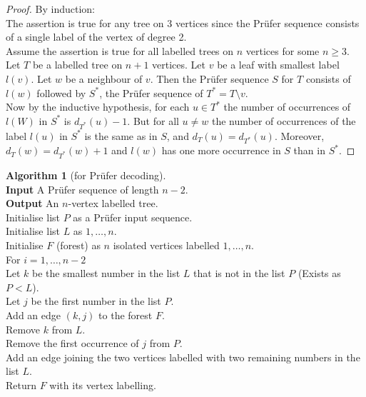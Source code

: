 \documentclass{article}
\theoremstyle{definition}
\newtheorem*{alg}{Algorithm}
\begin{document}
\begin{proof}
By induction: \\
The assertion is true for any tree on 3 vertices since the Pr\"ufer sequence consists of a single label of the vertex of degree 2. \\
Assume the assertion is true for all labelled trees on $n$ vertices for some $n\ge 3$.\\
Let $T$ be a labelled tree on $n+1$ vertices.
Let $v$ be a leaf with smallest label $l(v)$.
Let $w$ be a neighbour of $v$.
Then the Pr\"ufer sequence $S$ for $T$ consists of $l(w)$ followed by $S^*$, the Pr\"ufer sequence of $T^* = T\setminus v$. \\
Now by the inductive hypothesis, for each $u\in T^*$ the number of occurrences of $l(W)$ in $S^*$ is $d_{T^*}(u)-1$.
But for all $u\ne w$ the number of occurrences of the label $l(u)$ in $S^*$ is the same as in $S$, and $d_T(u)=d_{T^*}(u)$.
Moreover, $d_T(w) = d_{T^*}(w) + 1$ and $l(w)$ has one more occurrence in $S$ than in $S^*$.
\end{proof}

\begin{alg}[for Pr\"ufer decoding]~\\
\textbf{Input} A Pr\"ufer sequence of length $n-2$.\\
\textbf{Output} An $n$-vertex labelled tree.\\
Initialise list $P$ as a Pr\"ufer input sequence. \\
Initialise list $L$ as $1,\ldots, n$. \\
Initialise $F$ (forest) as $n$ isolated vertices labelled $1,\ldots, n$. \\
For $i=1,\ldots, n-2$ \\
\indent Let $k$ be the smallest number in the list $L$ that is not in the list $P$ (Exists as $P<L$). \\
\indent Let $j$ be the first number in the list $P$. \\
\indent Add an edge $(k,j)$ to the forest $F$.\\
\indent Remove $k$ from $L$.\\
\indent Remove the first occurrence of $j$ from $P$.\\
Add an edge joining the two vertices labelled with two remaining numbers in the list $L$.\\
Return $F$ with its vertex labelling.
\end{alg}

\end{document}
